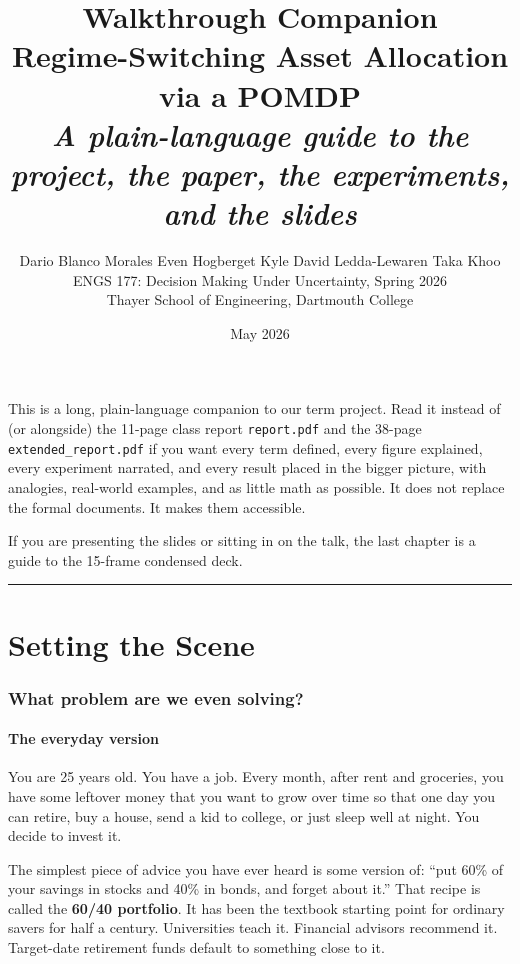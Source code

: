 \documentclass[11pt]{article}
\title{
  \LARGE\textbf{Walkthrough Companion}\\[6pt]
  \large Regime-Switching Asset Allocation via a POMDP\\[2pt]
  \normalsize\itshape A plain-language guide to the project, the paper, the experiments, and the slides
}
\author{
  Dario Blanco Morales \quad Even Hogberget \quad Kyle David Ledda-Lewaren \quad Taka Khoo \\[2pt]
  \small ENGS 177: Decision Making Under Uncertainty, Spring 2026 \\
  \small Thayer School of Engineering, Dartmouth College
}
\date{May 2026}
\begin{document}
\maketitle

\vspace{-1em}
\begin{plainenglish}
This is a long, plain-language companion to our term project. Read it instead of (or alongside) the 11-page class report \texttt{report.pdf} and the 38-page \texttt{extended\_report.pdf} if you want every term defined, every figure explained, every experiment narrated, and every result placed in the bigger picture, with analogies, real-world examples, and as little math as possible. It does not replace the formal documents. It makes them accessible.

If you are presenting the slides or sitting in on the talk, the last chapter is a guide to the 15-frame condensed deck.
\end{plainenglish}

\tableofcontents
\bigskip\hrule

\part{Setting the Scene}

\section{What problem are we even solving?}

\subsection{The everyday version}

You are 25 years old. You have a job. Every month, after rent and groceries, you have some leftover money that you want to grow over time so that one day you can retire, buy a house, send a kid to college, or just sleep well at night. You decide to invest it.

The simplest piece of advice you have ever heard is some version of: ``put 60\% of your savings in stocks and 40\% in bonds, and forget about it.'' That recipe is called the \textbf{60/40 portfolio}. It has been the textbook starting point for ordinary savers for half a century. Universities teach it. Financial advisors recommend it. Target-date retirement funds default to something close to it.
\end{document}
